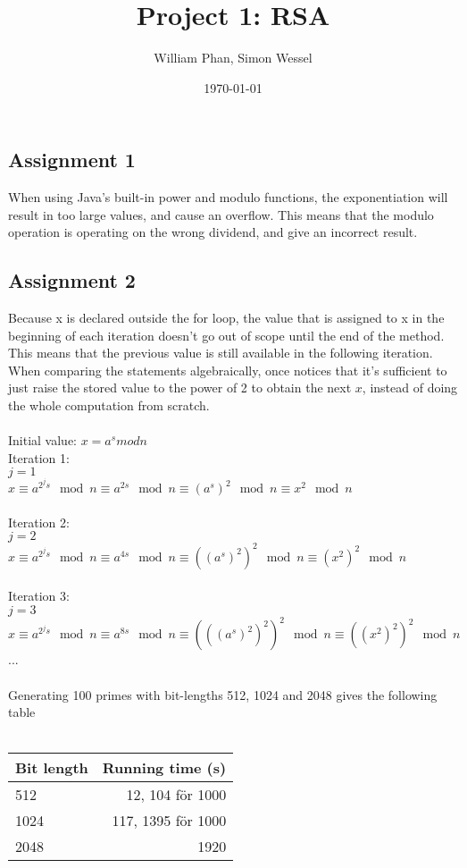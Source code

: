 \documentclass[11pt,a4paper]{article}
\title{Project 1: RSA} %
\author{William Phan, Simon Wessel}
\date{\today} %
\begin{document}
\maketitle %

\setcounter{secnumdepth}{0}

\subsection{Assignment 1}
When using Java's built-in power and modulo functions, the exponentiation will result in too large values, and cause an overflow. This means that the modulo operation is operating on the wrong dividend, and give an incorrect result.

\subsection{Assignment 2}
Because x is declared outside the for loop, the value that is assigned to x in the beginning of each iteration doesn't go out of scope until the end of the method. This means that the previous value is still available in the following iteration. When comparing the statements algebraically, once notices that it's sufficient to just raise the stored value to the power of 2 to obtain the next $x$, instead of doing the whole computation from scratch.
\\\\
Initial value: $x = a^s mod n$ \\
Iteration 1: \\
$j = 1$ \\
$x \equiv a^{ 2^j s } \mod n \equiv a^{ 2s } \mod n \equiv (a^s)^2 \mod n \equiv x^2 \mod n$ \\\\
Iteration 2: \\
$j = 2$ \\
$x \equiv a^{ 2^j s } \mod n \equiv a^{ 4s } \mod n \equiv ((a^s)^2)^2 \mod n \equiv (x^2)^2 \mod n$ \\\\
Iteration 3: \\
$j = 3$ \\
$x \equiv a^{ 2^j s } \mod n \equiv a^{ 8s } \mod n \equiv (((a^s)^2)^2)^2 \mod n \equiv ((x^2)^2)^2 \mod n$ \\
...
\\\\
Generating 100 primes with bit-lengths 512, 1024 and 2048 gives the following table \\\\
\begin{tabular}{ l | r }
	Bit length & Running time (s)\\ \hline
	512 & 12, 104 för 1000 \\
	1024 & 117, 1395 för 1000 \\
	2048 & 1920 \\
\end{tabular}
\\\\
\end{document}
